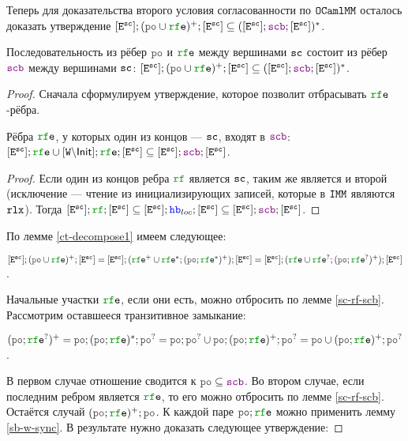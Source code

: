 Теперь для доказательства второго условия согласованности по $\mathtt{OCaml}\allowbreak \mathtt{MM}$ осталось доказать утверждение $[\lE^{\sco}];(\lPO \cup \lRFE)^{+} ; [\lE^{\sco}] \subseteq ([\lE^\sco] ; \lSCB ; [\lE^\sco])^{*}$. 

\begin{thrm} \label{sc-po-rfe-pscb}
  Последовательность из рёбер $\lPO$ и $\lRFE$ между вершинами ${\mathtt{sc}}$ состоит из рёбер $\lSCB$ между вершинами ${\mathtt{sc}}$: $[\lE^{\sco}];(\lPO \cup \lRFE)^{+} ; [\lE^{\sco}] \subseteq ([\lE^\sco] ; \lSCB ; [\lE^\sco])^{*}$.
\end{thrm}
\begin{proof}

  Сначала сформулируем утверждение, которое позволит отбрасывать $\lRFE$-рёбра. 

  \begin{lm} \label{sc-rf-scb}
    Рёбра $\lRFE$, у которых один из концов --- ${\mathtt{sc}}$, входят в $\lSCB$: $[\lE^{\sco}];\lRFE \cup [\lW\backslash \Init];\lRFE;[\lE^{\sco}] \subseteq [\lE^\sco] ; \lSCB ; [\lE^\sco]$. 
  \end{lm}
  \begin{proof}    
    Если один из концов ребра $\lRF$ является ${\mathtt{sc}}$, таким же является и второй (исключение --- чтение из инициализирующих записей, которые в $\mathtt{IMM}$ являются $\mathtt{rlx}$).
    Тогда $[\lE^{\sco}];\lRF;[\lE^{\sco}] \subseteq [\lE^{\sco}];\lHB_{loc};[\lE^{\sco}] \subseteq [\lE^{\sco}];\lSCB;[\lE^{\sco}]$.
  \end{proof}
  
  По лемме \ref{ct-decompose1} имеем следующее:

  $[\lE^{\sco}];(\lPO \cup \lRFE)^{+};[\lE^{\sco}] = [\lE^{\sco}];(\lRFE^{+} \cup \lRFE^{*} ; (\lPO ; \lRFE^{*})^{+});[\lE^{\sco}]=[\lE^{\sco}];(\lRFE \cup \lRFE^{?} ; (\lPO ; \lRFE^{?})^{+}); [\lE^{\sco}]$.

  Начальные участки $\lRFE$, если они есть, можно отбросить по лемме \ref{sc-rf-scb}. Рассмотрим оставшееся транзитивное замыкание:

  $(\lPO ; \lRFE^{?})^{+} = \lPO; (\lPO ; \lRFE)^{*} ; \lPO^? = \lPO; \lPO^{?} \cup \lPO; (\lPO ; \lRFE)^{+};\lPO^? = \lPO \cup (\lPO ; \lRFE)^{+};\lPO^?$. 

  В первом случае отношение сводится к  $\lPO \subseteq \lSCB$. Во втором случае, если последним ребром является $\lRFE$, то его можно отбросить по лемме \ref{sc-rf-scb}. Остаётся случай $(\lPO ; \lRFE)^{+} ; \lPO$. К каждой паре $\lPO ; \lRFE$ можно применить лемму \ref{sb-w-sync}. В результате нужно доказать следующее утверждение:


\end{proof}
